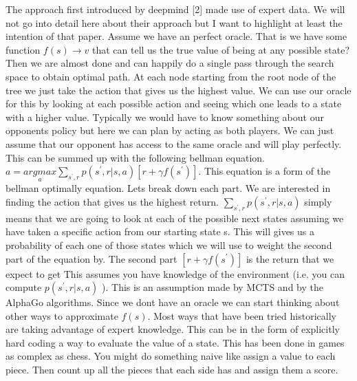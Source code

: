    The approach first introduced by deepmind [2] made use of expert data. We will not go into detail here about their approach but I want to highlight at least the intention of that paper. Assume we have an perfect oracle. That is we have some function $ f(s) \rightarrow v$  that can tell us the true value of being at any possible state? Then we are almost done and can happily do a single pass through the search space to obtain optimal path. At each node starting from the root node of the tree we just take the action that gives us the highest value. We can use our oracle for this by looking at each possible action and seeing which one leads to a state with a higher value. Typically we would have to know something about our opponents policy but here we can plan by acting as both players. We can just assume that our opponent has access to the same oracle and will play perfectly. 
   This can be summed up with the following bellman equation.
   $ a = \underset{a}{argmax} \sum_{s^{'},r} p(s^{'},r | s,a) [r + \gamma f(s^{'})]$. This equation is a form of the bellman optimally equation. Lets break down each part. We are interested in finding the action that gives us the highest return. $ \sum_{s^{'},r} p(s^{'},r | s,a) $ simply means that we are going to look at each of the possible next states assuming we have taken a specific action from our starting state s. This will gives us a probability of each one of those states which we will use to weight the second part of the equation by. The second part $[r + \gamma f(s^{'})]$ is the return that we expect to get
    This assumes you have knowledge of the environment (i.e. you can compute $p(s^{'},r | s,a) $ ). This is an assumption made by MCTS and by the AlphaGo algorithms.
    Since we dont have an oracle we can start thinking about other ways to approximate $f(s)$. Most ways that have been tried historically are taking advantage of expert knowledge. This can be in the form of explicitly hard coding a way to evaluate the value of a state. This has been done in games as complex as chess. You might do something naive like assign a value to each piece. Then count up all the pieces that each side has and assign them a score. 
    

